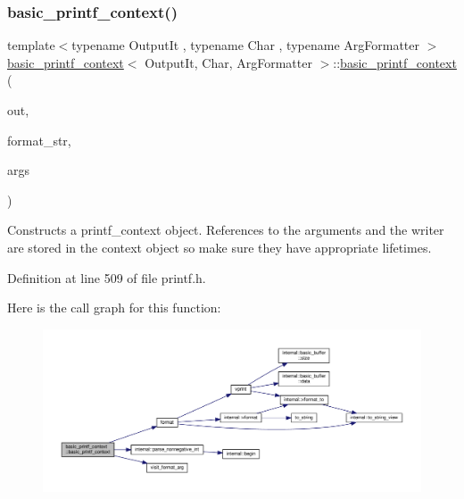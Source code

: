 \subsubsection{\texorpdfstring{basic\+\_\+printf\+\_\+context()}{basic\_printf\_context()}}
{\footnotesize\ttfamily template$<$typename Output\+It , typename Char , typename Arg\+Formatter $>$ \\
\hyperlink{classbasic__printf__context}{basic\+\_\+printf\+\_\+context}$<$ Output\+It, Char, Arg\+Formatter $>$\+::\hyperlink{classbasic__printf__context}{basic\+\_\+printf\+\_\+context} (\begin{DoxyParamCaption}\item[{Output\+It}]{out,  }\item[{\hyperlink{classbasic__string__view}{basic\+\_\+string\+\_\+view}$<$ \hyperlink{classbasic__printf__context_a7f19ba5dfbcd66a87281c4b05bcf324e}{char\+\_\+type} $>$}]{format\+\_\+str,  }\item[{\hyperlink{classbasic__format__args}{basic\+\_\+format\+\_\+args}$<$ \hyperlink{classbasic__printf__context}{basic\+\_\+printf\+\_\+context}$<$ Output\+It, Char, Arg\+Formatter $>$ $>$}]{args }\end{DoxyParamCaption})\hspace{0.3cm}{\ttfamily [inline]}}

Constructs a {\ttfamily printf\+\_\+context} object. References to the arguments and the writer are stored in the context object so make sure they have appropriate lifetimes.  

Definition at line 509 of file printf.\+h.

Here is the call graph for this function\+:
\nopagebreak
\begin{figure}[H]
\begin{center}
\leavevmode
\includegraphics[width=350pt]{classbasic__printf__context_ae71967bec500702473ba5b98d4e36aa2_cgraph}
\end{center}
\end{figure}



